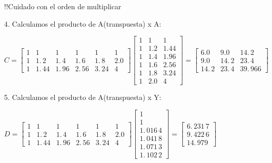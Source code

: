 \documentclass{article}
\begin{document}
!!Cuidado con el orden de multiplicar

4. Calculamos el producto de A(transpuesta) x A:

$C=\left[ 
\begin{array}{cccccc}
1 & 1 & 1 & 1 & 1 & 1 \\ 
1 & 1.\,\allowbreak 2 & 1.\,\allowbreak 4 & 1.\,\allowbreak 6 & 
1.\,\allowbreak 8 & 2.0 \\ 
1 & 1.\,\allowbreak 44 & 1.\,\allowbreak 96 & 2.\,\allowbreak 56 & 
3.\,\allowbreak 24 & 4%
\end{array}%
\right] \left[ 
\begin{array}{ccc}
1 & 1 & 1 \\ 
1 & 1.2 & 1.44 \\ 
1 & 1.4 & 1.96 \\ 
1 & 1.6 & 2.56 \\ 
1 & 1.8 & 3.24 \\ 
1 & 2.0 & 4%
\end{array}%
\right] =\allowbreak \left[ 
\begin{array}{ccc}
6.0 & 9.0 & 14.\,\allowbreak 2 \\ 
9.0 & 14.\,\allowbreak 2 & 23.\,\allowbreak 4 \\ 
14.\,\allowbreak 2 & 23.\,\allowbreak 4 & 39.\,\allowbreak 966%
\end{array}%
\right] \allowbreak $

\bigskip

5. Calculamos el producto de A(transpuesta) x Y:

$D=\left[ 
\begin{array}{cccccc}
1 & 1 & 1 & 1 & 1 & 1 \\ 
1 & 1.\,\allowbreak 2 & 1.\,\allowbreak 4 & 1.\,\allowbreak 6 & 
1.\,\allowbreak 8 & 2.0 \\ 
1 & 1.\,\allowbreak 44 & 1.\,\allowbreak 96 & 2.\,\allowbreak 56 & 
3.\,\allowbreak 24 & 4%
\end{array}%
\right] \left[ 
\begin{array}{c}
1 \\ 
1 \\ 
1.\,\allowbreak 016\,4 \\ 
1.\,\allowbreak 041\,8 \\ 
1.\,\allowbreak 071\,3 \\ 
1.\,\allowbreak 102\,2%
\end{array}%
\right] =\allowbreak \left[ 
\begin{array}{c}
6.\,\allowbreak 231\,7 \\ 
9.\,\allowbreak 422\,6 \\ 
14.\,\allowbreak 979%
\end{array}%
\right] $
\end{document}
